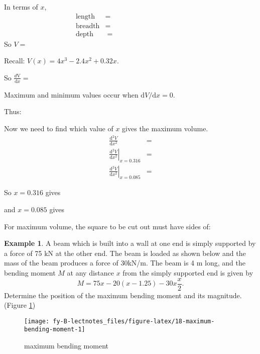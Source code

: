 \documentclass[
  english,
  11pt,
  oneside]{book}
\newcommand{\slide}{}
\theoremstyle{definition}
\theoremstyle{definition}
\newtheorem{example}{Example}[chapter]
\theoremstyle{definition}
\theoremstyle{definition}
\theoremstyle{remark}
\begin{document}
\begin{slidesonly}

In terms of \(x\),
\begin{align*}
\text{length} &=\\
\text{breadth} &=\\
\text{depth} &=\phantom{aklsdhflakjshdfklasdf}
\end{align*}
So \(V=\)

\slide

Recall: \(V(x)=4x^3 - 2.4x^2 + 0.32x\).

So \(\frac{d\mathrm{V}}{\mathrm{d} x} =\)

Maximum and minimum values occur when \(\mathrm{d}V/\mathrm{d}x  = 0\).

Thus:

\slide

Now we need to find which value of \(x\) gives the maximum volume.
\begin{align*}
\frac{\mathrm{d}^2 V}{\mathrm{d} x^2} &= \\
\left.\frac{\mathrm{d}^2 V}{\mathrm{d} x^2}\right\vert_{x=0.316} &=\\
\left.\frac{\mathrm{d}^2 V}{\mathrm{d} x^2}\right\vert_{x=0.085} &=
\end{align*}

So \(x=0.316\) gives

and \(x=0.085\) gives

For maximum volume, the square to be cut out must have sides of:

\slide

\end{slidesonly}

\begin{example}
A beam which is built into a wall at one end is simply supported by a force of 75 kN at the other end. The beam is loaded as shown below and the mass of the beam produces a force of 30kN/m. The beam is 4 m long, and the bending moment \(M\) at any distance \(x\) from the simply supported end is given by
\[
M = 75x-20(x-1.25)-30x\frac{x}{2}.
\]
Determine the position of the maximum bending moment and its magnitude. (Figure \ref{fig:18-maximum-bending-moment})
\end{example}

\begin{figure}

{\centering \texttt{[image: fy-B-lectnotes\_files/figure-latex/18-maximum-bending-moment-1]} 

}

\caption{maximum bending moment}\label{fig:18-maximum-bending-moment}
\end{figure}
\slide
\end{document}
